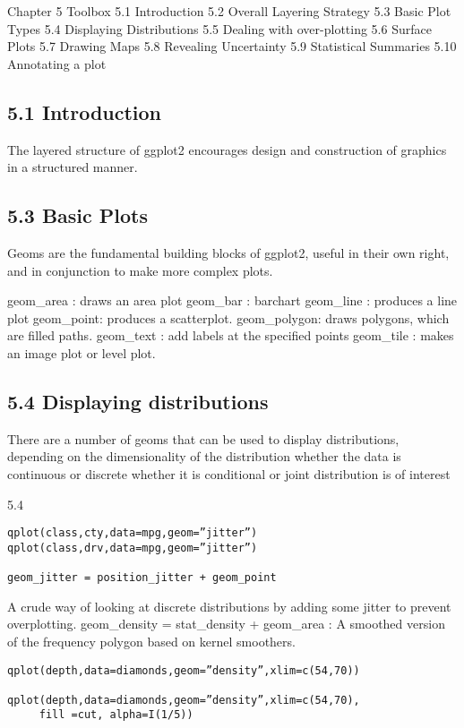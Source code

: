 Chapter 5 Toolbox
5.1 Introduction
5.2 Overall Layering Strategy
5.3 Basic Plot Types
5.4 Displaying Distributions
5.5 Dealing with over-plotting
5.6 Surface Plots
5.7 Drawing Maps
5.8 Revealing Uncertainty
5.9 Statistical Summaries
5.10 Annotating a plot
\subsection*{5.1 Introduction}
The layered structure of ggplot2 encourages design and construction of graphics in a structured manner.
\subsection*{5.3 Basic Plots}
Geoms are the fundamental building blocks of ggplot2, useful in their own right, and in conjunction to make more complex plots.

geom_area : draws an area plot
geom_bar : barchart
geom_line : produces a line plot
geom_point: produces a scatterplot.
geom_polygon: draws polygons, which are filled paths.
geom_text :  add labels at the specified points
geom_tile :  makes an image plot or level plot.
\subsection*{5.4 Displaying distributions}
There are a number of geoms that can be used to display distributions, depending on 
the dimensionality of the distribution
whether the data is continuous or discrete
whether it is conditional or joint distribution is of interest

5.4
\begin{verbatim}
qplot(class,cty,data=mpg,geom=”jitter”)
qplot(class,drv,data=mpg,geom=”jitter”)

geom_jitter = position_jitter + geom_point
\end{verbatim}

A crude way of looking at discrete distributions by adding some jitter to prevent overplotting.
geom_density = stat_density + geom_area :
A smoothed version of the frequency polygon based on kernel smoothers.

\begin{verbatim}
qplot(depth,data=diamonds,geom=”density”,xlim=c(54,70))

qplot(depth,data=diamonds,geom=”density”,xlim=c(54,70), 
     fill =cut, alpha=I(1/5))
\end{verbatim}     
